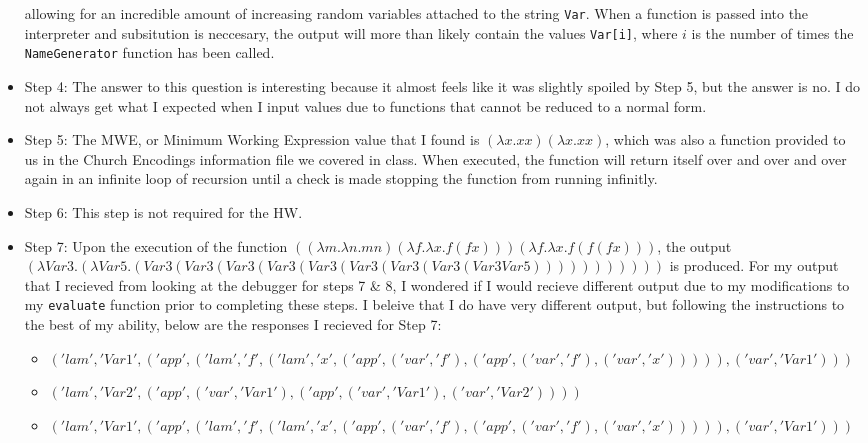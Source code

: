 \documentclass{article}
\theoremstyle{theorem}
\theoremstyle{definition}
\theoremstyle{remark}
\begin{document}
\begin{itemize}
        allowing for an incredible amount of increasing random variables attached to the string \texttt{Var}. When a function is passed into the interpreter and subsitution is neccesary, the output will more than likely 
        contain the values \texttt{Var[i]}, where $i$ is the number of times the \texttt{NameGenerator} function has been called.
  \item Step 4: The answer to this question is interesting because it almost feels like it was slightly spoiled by Step 5, but the answer is no. I do not always get what I expected when I input values due to functions 
        that cannot be reduced to a normal form.
  \item Step 5: The MWE, or Minimum Working Expression value that I found is \texttt{$(\lambda x.x x)(\lambda x.x x)$}, which was also a function provided to us in the Church Encodings information file we covered in class.
        When executed, the function will return itself over and over and over again in an infinite loop of recursion until a check is made stopping the function from running infinitly. 
  \item Step 6: This step is not required for the HW.
  \item Step 7: Upon the execution of the function \texttt{$((\lambda m.\lambda n. m n) (\lambda f.\lambda x. f (f x))) (\lambda f.\lambda x. f (f (f x)))$}, 
        the output \texttt{$(\lambda Var3.(\lambda Var5.(Var3 (Var3 (Var3 (Var3 (Var3 (Var3 (Var3 (Var3 (Var3 Var5)))))))))))$} is produced.
        \newline \newline For my output that I recieved from looking at the debugger for steps 7 \& 8, I wondered if I would recieve different output due to my modifications to my \texttt{evaluate} function 
        prior to completing these steps. I beleive that I do have very different output, but following the instructions to the best of my ability, below are the responses I recieved for Step 7:
        \begin{itemize}
        \item \texttt{$('lam', 'Var1', ('app', ('lam', 'f', ('lam', 'x', ('app', ('var', 'f'), ('app', ('var', 'f'), ('var', 'x'))))), ('var', 'Var1')))$}
        \item \texttt{$('lam', 'Var2', ('app', ('var', 'Var1'), ('app', ('var', 'Var1'), ('var', 'Var2'))))$}
        \item \texttt{$('lam', 'Var1', ('app', ('lam', 'f', ('lam', 'x', ('app', ('var', 'f'), ('app', ('var', 'f'), ('var', 'x'))))), ('var', 'Var1')))$}

\end{itemize}
\end{itemize}
\end{document}
